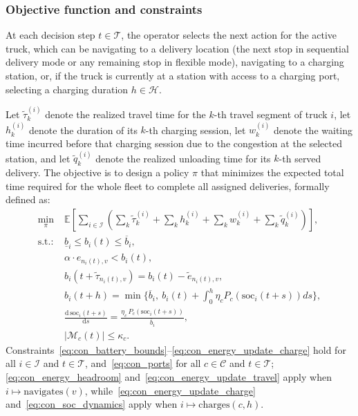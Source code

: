 \documentclass[journal]{IEEEtran}
\begin{document}
\subsubsection{Objective function and constraints}\label{sec:obj_constraints}

At each decision step $t \in \mathcal{T}$, the operator selects the next action for the active truck, which can be navigating to a delivery location (the next stop in sequential delivery mode or any remaining stop in flexible mode), navigating to a charging station, or, if the truck is currently at a station with access to a charging port, selecting a charging duration $h\in\mathcal{H}$.

Let $\tilde{\tau}^{(i)}_{k}$ denote the realized travel time for the $k$-th travel segment of truck $i$, let $h^{(i)}_{k}$ denote the duration of its $k$-th charging session, let $w^{(i)}_{k}$ denote the waiting time incurred before that charging session due to the congestion at the selected station, and let $\tilde{q}^{(i)}_{k}$ denote the realized unloading time for its $k$-th served delivery. 
The objective is to design a policy $\pi$ that minimizes the expected total time required for the whole fleet to complete all assigned deliveries, formally defined as:
\begin{align}
\min_{\pi}\;
& \mathbb{E}\!\left[\sum_{i\in\mathcal{I}}
\left(
\sum_{k}\tilde{\tau}^{(i)}_{k}
+
\sum_{k} h^{(i)}_{k}
+
\sum_{k} w^{(i)}_{k}
+
\sum_{k}\tilde{q}^{(i)}_{k}
\right)\right],
\label{eq:obj_time}
\\
\text{s.t.:} \;
& \underline{b}_i \le b_i(t) \le \overline{b}_i,
\label{eq:con_battery_bounds}
\\
& \alpha\cdot e_{n_i(t),v} < b_i(t),
\label{eq:con_energy_headroom}
\\
& b_i\!\left(t+\tilde{\tau}_{n_i(t),v}\right)= b_i(t)-\tilde{e}_{n_i(t),v},
\label{eq:con_energy_update_travel}
\\
& b_i(t+h)=\min\!\Big\{\overline{b}_i,\ b_i(t)+ \!\int_{0}^{h}\!\eta_c  P_c\!\left(\mathrm{soc}_i(t+s)\right) ds \Big\},
\label{eq:con_energy_update_charge}
\\
& \frac{\mathrm{d}\,\mathrm{soc}_i(t+s)}{\mathrm{d}s} = \frac{\eta_c\,P_c(\mathrm{soc}_i(t+s))}{\overline{b}_i},
\label{eq:con_soc_dynamics}
\\
& |\mathcal{M}_c(t)| \le \kappa_c .
\label{eq:con_ports}
\end{align}
Constraints~\eqref{eq:con_battery_bounds}--\eqref{eq:con_energy_update_charge} hold for all $i\in\mathcal{I}$ and $t\in\mathcal{T}$, and~\eqref{eq:con_ports} for all $c\in\mathcal{C}$ and $t\in\mathcal{T}$; \eqref{eq:con_energy_headroom} and~\eqref{eq:con_energy_update_travel} apply when $i\mapsto\text{navigates}(v)$, while~\eqref{eq:con_energy_update_charge} and~\eqref{eq:con_soc_dynamics} apply when $i\mapsto\text{charges}(c,h)$.
\end{document}
